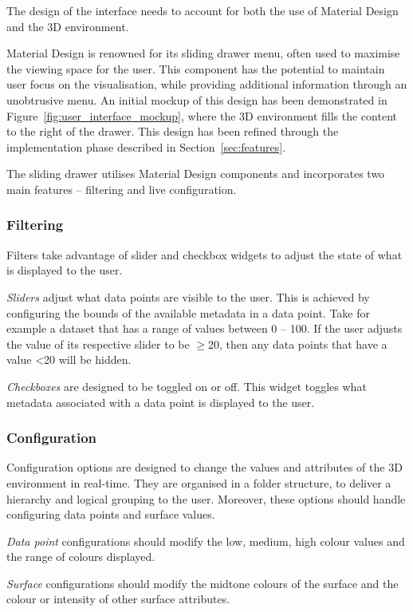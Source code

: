 {{		The design of the interface needs to account for both the use of Material Design and the 3D environment. 

		Material Design is renowned for its sliding drawer menu, often used to maximise the viewing space for the user. This component has the potential to maintain user focus on the visualisation, while providing additional information through an unobtrusive menu. An initial mockup of this design has been demonstrated in Figure~\ref{fig:user_interface_mockup}, where the 3D environment fills the content to the right of the drawer. This design has been refined through the implementation phase described in Section~\ref{sec:features}.


		

		The sliding drawer utilises Material Design components and incorporates two main features -- filtering and live configuration.

		\subsubsection{Filtering} {
		\label{sec:filtering}

			Filters take advantage of slider and checkbox widgets to adjust the state of what is displayed to the user.

			\emph{Sliders} adjust what data points are visible to the user. This is achieved by configuring the bounds of the available metadata in a data point. Take for example a dataset that has a range of values between 0 -- 100. If the user adjusts the value of its respective slider to be $\ge$20, then any data points that have a value \textless20 will be hidden.
			
			\emph{Checkboxes} are designed to be toggled on or off. This widget toggles what metadata associated with a data point is displayed to the user.

		}

		\subsubsection{Configuration} {
		\label{sec:configuration}

			Configuration options are designed to change the values and attributes of the 3D environment in real-time. They are organised in a folder structure, to deliver a hierarchy and logical grouping to the user. Moreover, these options should handle configuring data points and surface values.

			\emph{Data point} configurations should modify the low, medium, high colour values and the range of colours displayed.

			\emph{Surface} configurations should modify the midtone colours of the surface and the colour or intensity of other surface attributes.

		}

	}

}

